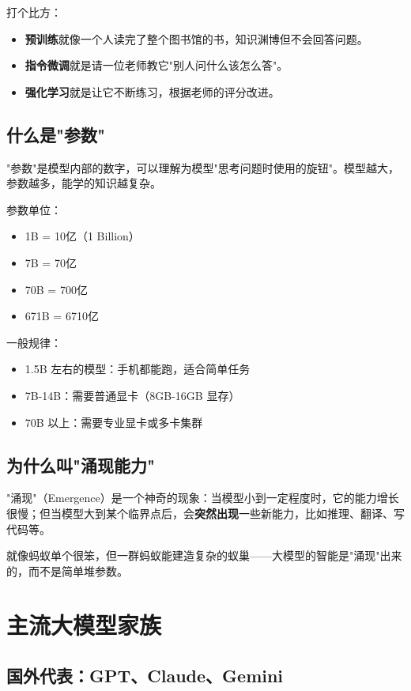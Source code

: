 \documentclass[12pt,UTF8]{ctexbook}
\begin{document}
打个比方：
\begin{itemize}
  \item \textbf{预训练}就像一个人读完了整个图书馆的书，知识渊博但不会回答问题。
  \item \textbf{指令微调}就是请一位老师教它"别人问什么该怎么答"。
  \item \textbf{强化学习}就是让它不断练习，根据老师的评分改进。
\end{itemize}

\section{什么是"参数"}

"参数"是模型内部的数字，可以理解为模型"思考问题时使用的旋钮"。模型越大，参数越多，能学的知识越复杂。

参数单位：
\begin{itemize}
  \item 1B = 10亿（1 Billion）
  \item 7B = 70亿
  \item 70B = 700亿
  \item 671B = 6710亿
\end{itemize}

一般规律：
\begin{itemize}
  \item 1.5B 左右的模型：手机都能跑，适合简单任务
  \item 7B-14B：需要普通显卡（8GB-16GB 显存）
  \item 70B 以上：需要专业显卡或多卡集群
\end{itemize}

\section{为什么叫"涌现能力"}

"涌现"（Emergence）是一个神奇的现象：当模型小到一定程度时，它的能力增长很慢；但当模型大到某个临界点后，会\textbf{突然出现}一些新能力，比如推理、翻译、写代码等。

就像蚂蚁单个很笨，但一群蚂蚁能建造复杂的蚁巢——大模型的智能是"涌现"出来的，而不是简单堆参数。

\chapter{主流大模型家族}

\section{国外代表：GPT、Claude、Gemini}
\end{document}
